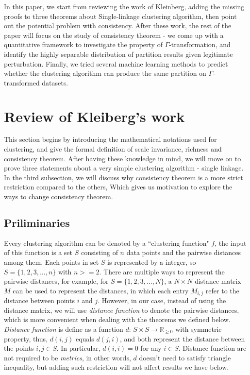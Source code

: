 \documentclass{uonmathreport}
\begin{document}
In this paper, we start from reviewing the work of Kleinberg, adding the missing proofs to three theorems about Single-linkage clustering algorithm, then point out the potential problem with consistency. After these work, the rest of the paper will focus on the study of consistency theorem - we come up with a quantitative framework to investigate the property of $\Gamma$-transformation, and identify the highly separable distribution of partition results given legitimate perturbation. Finally, we tried several machine learning methods to predict whether the clustering algorithm can produce the same partition on $\Gamma$-transformed datasets.

\section{Review of Kleiberg's work} \label{sec:background}
This section begins by introducing the mathematical notations used for clustering, and give the formal definition of scale invariance, richness and consistency theorem. After having these knowledge in mind, we will move on to prove three statements about a very simple clustering algorithm - single linkage. In the third subsection, we will discuss why consistency theorem  is a more strict restriction compared to the others, Which gives us motivation to explore the ways to change consistency theorem.
\subsection{Priliminaries} \label{subsec:priliminaries}
Every clustering algorithm can be denoted by a ``clustering function" $f$, the input of this function is a set $S$ consisting of $n$ data points and the pairwise distances among them. Each points in set $S$ is represented by a integer, so $S = \{1,2,3,...,n\}$ with $n>=2 $. There are multiple ways to represent the pairwise distances, for example, for $S = \{1,2,3,...,N\}$, a $N \times N$ distance matrix $M$ can be used to represent the distances, in which each entry $M_{i,j}$ refer to the distance between points $i$ and $j$. However, in our case, instead of using the distance matrix, we will use \textit{distance function} to denote the pairwise distances, which is more convenient when dealing with the theorems we defined below. \textit{Distance function} is define as a function $d$: $S \times S \rightarrow \mathbb{R}_{\ge 0}$ with symmetric property, thus, $d(i,j)$ equals $d(j,i)$, and both represent the distance between the points $i,j \in S$. In particular, $d(i,i) = 0$ for any $i\in S$. Distance function are not required to be \textit{metrics}, in other words, $d$ doesn't need to satisfy triangle inequality, but adding such restriction will not affect results we have below.
\end{document}

